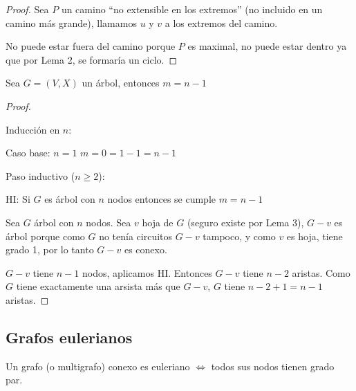 \begin{proof}
    Sea $P$ un camino ``no extensible en los extremos'' (no incluido en un camino más grande), llamamos $u$ y $v$ a los extremos del camino.

    No puede estar fuera del camino porque $P$ es maximal, no puede estar dentro ya que por Lema 2, se formaría un ciclo.
\end{proof}

\begin{lema}
    Sea $G = (V, X)$ un árbol, entonces $m = n - 1$
\end{lema}

\begin{proof}
    ~

    Inducción en $n$:

    Caso base: $n = 1$ $m = 0 = 1 - 1 = n - 1$

    Paso inductivo ($n \geq 2$):

    HI: Si $G$ es árbol con $n$ nodos entonces se cumple $m = n - 1$

    Sea $G$ árbol con $n$ nodos. Sea $v$ hoja de $G$ (seguro existe por Lema 3), $G - v$ es árbol porque como $G$ no tenía circuitos $G - v$ tampoco, y como $v$ es hoja, tiene grado 1, por lo tanto $G - v$ es conexo.

    $G - v$ tiene $n - 1$ nodos, aplicamos HI. Entonces $G - v$ tiene $n - 2$ aristas. Como $G$ tiene exactamente una arsista más que $G - v$, $G$ tiene $n - 2 + 1 = n - 1$ aristas.
\end{proof}

\subsection{Grafos eulerianos}

\begin{teo}
    Un grafo (o multigrafo) conexo es euleriano $\Longleftrightarrow$ todos sus nodos tienen grado par.
\end{teo}

